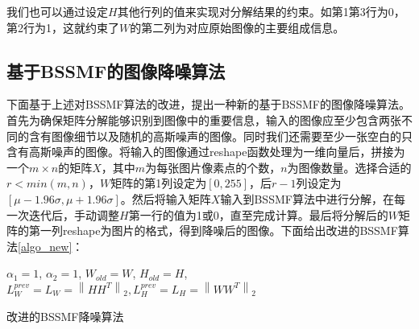 \documentclass[12pt]{article}
\begin{document}
我们也可以通过设定$H$其他行列的值来实现对分解结果的约束。如第1第3行为0，第2行为1，这就约束了$W$的第二列为对应原始图像的主要组成信息。

\subsection{基于BSSMF的图像降噪算法}
下面基于上述对BSSMF算法的改进，提出一种新的基于BSSMF的图像降噪算法。首先为确保矩阵分解能够识别到图像中的重要信息，输入的图像应至少包含两张不同的含有图像细节以及随机的高斯噪声的图像。同时我们还需要至少一张空白的只含有高斯噪声的图像。将输入的图像通过reshape函数处理为一维向量后，拼接为一个$m \times n$的矩阵$X$，其中$m$为每张图片像素点的个数，$n$为图像数量。选择合适的$r < min(m,n)$，$W$矩阵的第1列设定为$[0,255]$，后$r-1$列设定为$[\mu - 1.96\sigma,\mu + 1.96\sigma]$。然后将输入矩阵$X$输入到BSSMF算法中进行分解，在每一次迭代后，手动调整$H$第一行的值为1或0，直至完成计算。最后将分解后的$W$矩阵的第一列reshape为图片的格式，得到降噪后的图像。下面给出改进的BSSMF算法\ref{algo_new}：

\begin{algorithm}[H]
  

    { $\alpha_1 = 1$, $\alpha_2 = 1$, $W_{old} = W$, $H_{old} = H$, $L^{prev}_W = L_W = \left\lVert HH^T\right\rVert_2, L^{prev}_H = L_H = \left\lVert WW^T\right\rVert_2$ }

    
    \caption{改进的BSSMF降噪算法}
    \label{algo_new}
    
  \end{algorithm}\DecMargin{1em}
\end{document}

